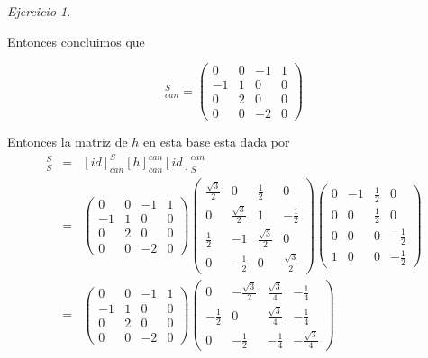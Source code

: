 \documentclass[11pt,a4paper]{article}
\theoremstyle{definition}
\theoremstyle{remark}
\newtheorem{exc}{Ejercicio}
\begin{document}
\begin{exc}
\begin{enumerate}
			Entonces concluimos que
			
			\begin{equation}
			[id]_{can}^S = 
			\begin{pmatrix}
	 		0 & 0 & -1 & 1
	 		\\ -1 & 1 & 0 & 0
	 		\\ 0 & 2 & 0 & 0
	 		\\ 0 & 0 & -2 & 0  		
	 		\end{pmatrix} \nonumber 
			\end{equation}
			
			Entonces la matriz de $ h $ en esta base esta dada por
			\begin{eqnarray}
			[h]_S^S & = & [id]_{can}^S[h]_{can}^{can}[id]_S^{can}\nonumber
			\\ & = & 
			\begin{pmatrix}
	 		0 & 0 & -1 & 1
	 		\\ -1 & 1 & 0 & 0
	 		\\ 0 & 2 & 0 & 0
	 		\\ 0 & 0 & -2 & 0  		
	 		\end{pmatrix}
			\begin{pmatrix}
	    	\frac{\sqrt{3}}{2} & 0 & \frac{1}{2} & 0
	    	\\ 0 & \frac{\sqrt{3}}{2} & 1 & -\frac{1}{2} 
	    	\\ \frac{1}{2} & -1 & \frac{\sqrt{3}}{2} & 0
	    	\\ 0 & -\frac{1}{2} & 0 & \frac{\sqrt{3}}{2}
	    	\end{pmatrix} 
			\begin{pmatrix}
			0 & -1 & \frac{1}{2} & 0
			\\ 0 & 0 & \frac{1}{2} & 0
			\\ 0 & 0 & 0 & -\frac{1}{2}  
			\\ 1 & 0 & 0 & -\frac{1}{2}
			\end{pmatrix} \nonumber
			\\ & = &
			\begin{pmatrix}
	 		0 & 0 & -1 & 1
	 		\\ -1 & 1 & 0 & 0
	 		\\ 0 & 2 & 0 & 0
	 		\\ 0 & 0 & -2 & 0  		
	 		\end{pmatrix} 
			\begin{pmatrix}
			0 & -\frac{\sqrt{3}}{2} & \frac{\sqrt{3}}{4} & -\frac{1}{4}
			\\ -\frac{1}{2} & 0 & \frac{\sqrt{3}}{4} & -\frac{1}{4}
			\\ 0 & -\frac{1}{2} & -\frac{1}{4} & -\frac{\sqrt{3}}{4}  

\end{pmatrix}
\end{eqnarray}
\end{enumerate}
\end{exc}
\end{document}
